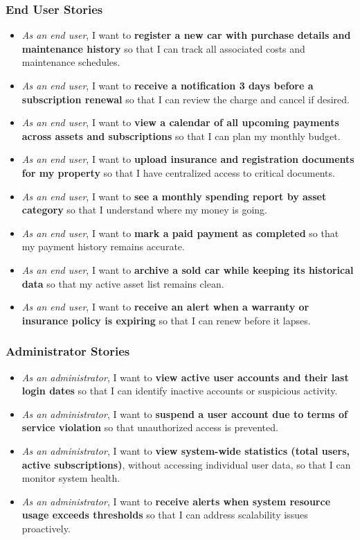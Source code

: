 \documentclass[11pt, a4paper]{article}
\begin{document}
	\subsubsection{End User Stories}
	\begin{itemize}
		\item \textit{As an end user}, I want to \textbf{register a new car with purchase details and maintenance history} so that I can track all associated costs and maintenance schedules.
		\item \textit{As an end user}, I want to \textbf{receive a notification 3 days before a subscription renewal} so that I can review the charge and cancel if desired.
		\item \textit{As an end user}, I want to \textbf{view a calendar of all upcoming payments across assets and subscriptions} so that I can plan my monthly budget.
		\item \textit{As an end user}, I want to \textbf{upload insurance and registration documents for my property} so that I have centralized access to critical documents.
		\item \textit{As an end user}, I want to \textbf{see a monthly spending report by asset category} so that I understand where my money is going.
		\item \textit{As an end user}, I want to \textbf{mark a paid payment as completed} so that my payment history remains accurate.
		\item \textit{As an end user}, I want to \textbf{archive a sold car while keeping its historical data} so that my active asset list remains clean.
		\item \textit{As an end user}, I want to \textbf{receive an alert when a warranty or insurance policy is expiring} so that I can renew before it lapses.
	\end{itemize}
	
	\subsubsection{Administrator Stories}
	\begin{itemize}
		\item \textit{As an administrator}, I want to \textbf{view active user accounts and their last login dates} so that I can identify inactive accounts or suspicious activity.
		\item \textit{As an administrator}, I want to \textbf{suspend a user account due to terms of service violation} so that unauthorized access is prevented.
		\item \textit{As an administrator}, I want to \textbf{view system-wide statistics (total users, active subscriptions)}, without accessing individual user data, so that I can monitor system health.
	\item \textit{As an administrator}, I want to \textbf{receive alerts when system resource usage exceeds thresholds} so that I can address scalability issues proactively.
\end{itemize}
\end{document}
